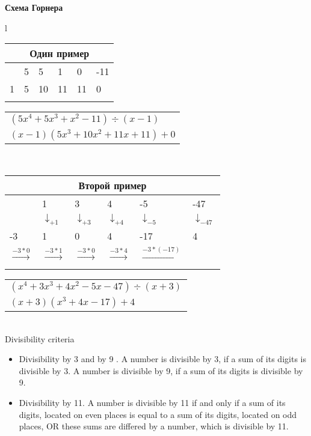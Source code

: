 \textbf{Схема Горнера}\\
\begin{tabular}{l}

\begin{tabular}{|l|l|l|l|l|l|}
	\multicolumn{6}{c}{Один пример} \\
	\hline
	&    
	5 &
	5 &
	1 &
	0 &
	-11 
	\\ 
	\hline
	1& 
	5 &
	10 &
	11 &
	11 &
	0\\
	\hline
	\multicolumn{1}{c}{}
\end{tabular}
\begin{tabular}{l}
	$(5x^4 + 5x^3 + x^2 -11) \div (x - 1) $ \\
	$(x - 1)(5x^3 + 10 x^2 + 11 x + 11) + 0$
\end{tabular}
\\
\begin{tabular}{|l|l|l|l|l|l|}
	\multicolumn{6}{c}{Второй пример} \\
	\hline   
	&
	1 &
	3 &
	4 &
	-5 &
	-47 
	\\
	
	
	\hline
	&
	$\downarrow_{+1}$ &
	$\downarrow_{+3}$ &
	$\downarrow_{+4}$ &
	$\downarrow_{-5}$ &
	$\downarrow_{-47}$\\
	 
	\hline
	-3& 
	1 &
	0 &
	4 &
	-17 &
	4\\
	
	\hline
	
	
	
	$\xrightarrow[]{-3 * 0}$ &
	$\xrightarrow[]{-3 * 1}$  &
	$\xrightarrow[]{-3 * 0}$  &
	$\xrightarrow[]{-3 * 4}$  &
	$\xrightarrow[]{-3 * (-17)}$
	&
	\\ 
	\hline
	
\end{tabular}
\begin{tabular}{l}
	$(x^4 + 3x^3 + 4x^2 - 5x -47) \div (x + 3) $ \\
	$(x + 3)(x^3 + 4x -17) + 4$
\end{tabular}

\end{tabular}\\


Divisibility criteria
\begin{itemize}
    \item Divisibility by 3 and by 9 . A number is divisible by 3, if  a sum of its digits is divisible by 3. A number is divisible by 9, if a sum of its digits is divisible by 9.
    \item  Divisibility by 11. A number is divisible by 11 if and only if a sum of its digits, located on even places is equal to a sum of its digits, located on odd places,  OR  these sums are differed by a number, which is divisible by 11. 
\end{itemize}


